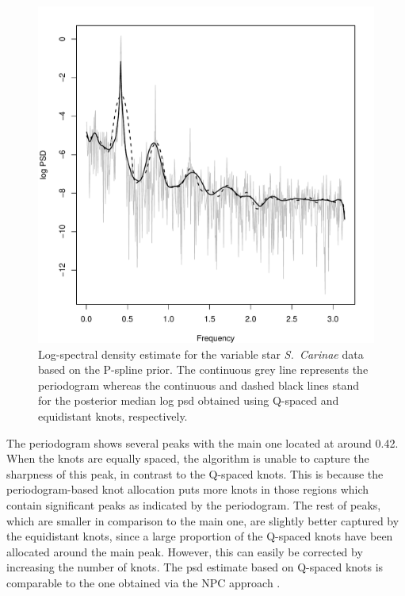 \documentclass[twocolumn,final]{svjour3}
\begin{document}
\begin{figure}[]
	\centering
	\includegraphics[scale=0.4,clip=true,angle=0]{carinae.pdf}
	\caption{Log-spectral density estimate for the variable star {\it S.\ Carinae} data based on the P-spline prior. The continuous grey line represents the periodogram whereas the continuous and dashed black lines stand for the posterior median log psd obtained using Q-spaced and equidistant knots, respectively.}
	\label{fig:carinae}
\end{figure}

The periodogram shows several peaks with the main one located at around 0.42.  When the knots are equally spaced, the algorithm is unable to capture the sharpness of this peak,
in contrast to the Q-spaced knots.  This is because the periodogram-based knot allocation puts more knots in those regions which contain significant peaks as indicated by the periodogram.  The rest of peaks, which are smaller in comparison to the main one, are slightly better captured by the equidistant knots, since a large proportion of the Q-spaced knots have been allocated around the main peak. However, this can easily  be corrected by increasing the number of knots.  The psd estimate based on Q-spaced knots is comparable to the one obtained via the NPC approach \citep{Kirch:2018}.

\end{document}
